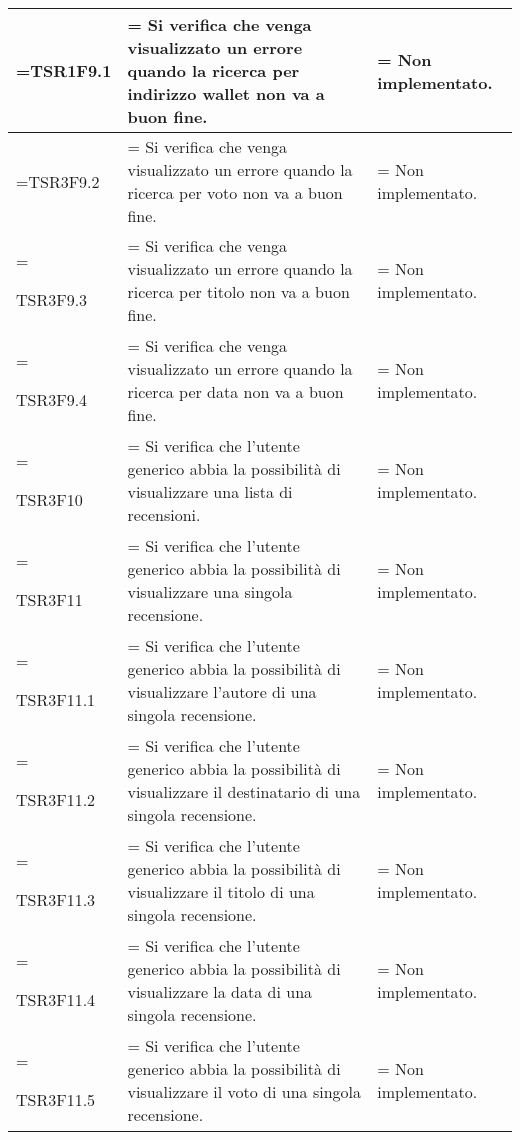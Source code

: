 \begin{xltabular}{\textwidth} {
            >{\hsize\linewidth=\hsize}X
            >{\hsize\linewidth=\hsize}X
            >{\hsize\linewidth=\hsize}X
        }
        TSR1F9.1&
        Si verifica che venga visualizzato un errore quando la ricerca per indirizzo wallet non va a buon fine. &
        Non implementato.
        \\ \hline
        
        TSR3F9.2&
        Si verifica che venga visualizzato un errore quando la ricerca per voto non va a buon fine. &
        Non implementato.
        \\ \hline
        
        TSR3F9.3&
        Si verifica che venga visualizzato un errore quando la ricerca per titolo non va a buon fine. &
        Non implementato.
        \\ \hline

        TSR3F9.4&
        Si verifica che venga visualizzato un errore quando la ricerca per data non va a buon fine. &
        Non implementato.
        \\ \hline

        TSR3F10 &
        Si verifica che l'utente generico abbia la possibilità di visualizzare una lista di recensioni.  &
        Non implementato.
        \\ \hline

        TSR3F11 &
        Si verifica che l'utente generico abbia la possibilità di visualizzare una singola recensione. &
        Non implementato.
        \\ \hline

        TSR3F11.1 &
        Si verifica che l'utente generico abbia la possibilità di visualizzare l'autore di una singola recensione.  &
        Non implementato.
        \\ \hline

        TSR3F11.2 &
        Si verifica che l'utente generico abbia la possibilità di visualizzare il destinatario di una singola recensione.  &
        Non implementato.
        \\ \hline

        TSR3F11.3 &
        Si verifica che l'utente generico abbia la possibilità di visualizzare il titolo di una singola recensione.  &
        Non implementato.
        \\ \hline

        TSR3F11.4 &
        Si verifica che l'utente generico abbia la possibilità di visualizzare la data di una singola recensione.  &
        Non implementato.
        \\ \hline
        
        TSR3F11.5 &
        Si verifica che l'utente generico abbia la possibilità di visualizzare il voto di una singola recensione.  &
        Non implementato.
        \\ \hline


\end{xltabular}
